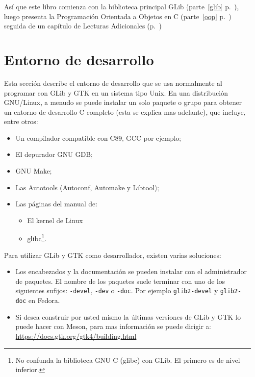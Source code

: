 Así que este libro comienza con la biblioteca principal GLib (parte~\ref{glib} p.~\pageref{glib}), luego presenta la Programación Orientada a Objetos en C (parte~\ref{oop} p.~\pageref{oop}) seguida de un capítulo de Lecturas Adicionales (p.~\pageref{further-reading})

\section{Entorno de desarrollo}
\label{intro-dev-env}

Esta sección describe el entorno de desarrollo que se usa normalmente al programar con GLib y GTK en un sistema tipo Unix. En una distribución GNU/Linux, a menudo se puede instalar un solo paquete o grupo para obtener un entorno de desarrollo C completo (esta se explica mas adelante), que incluye, entre otros:

\begin{itemize}
    \item Un compilador compatible con C89, GCC por ejemplo;
    \item El depurador GNU GDB;
    \item GNU Make;
    \item Las Autotools (Autoconf, Automake y Libtool);
    \item Las páginas del manual de:
    \begin{itemize}
        \item El kernel de Linux
        \item glibc\footnote{No confunda la biblioteca GNU C (glibc) con GLib. El primero es de nivel inferior.}.
    \end{itemize}
\end{itemize}

Para utilizar GLib y GTK como desarrollador, existen varias soluciones:

\begin{itemize}
    \item Los encabezados y la documentación se pueden instalar con el administrador de paquetes. El nombre de los paquetes suele terminar con uno de los siguientes sufijos: \texttt{-devel}, \texttt{-dev} o \texttt{-doc}. Por ejemplo \texttt{glib2-devel} y \texttt{glib2-doc} en Fedora.
    \item Si desea construir por usted mismo la últimas versiones de GLib y GTK lo puede hacer con Meson, para mas información se puede dirigir a:\\
    \url{https://docs.gtk.org/gtk4/building.html}
\end{itemize}

